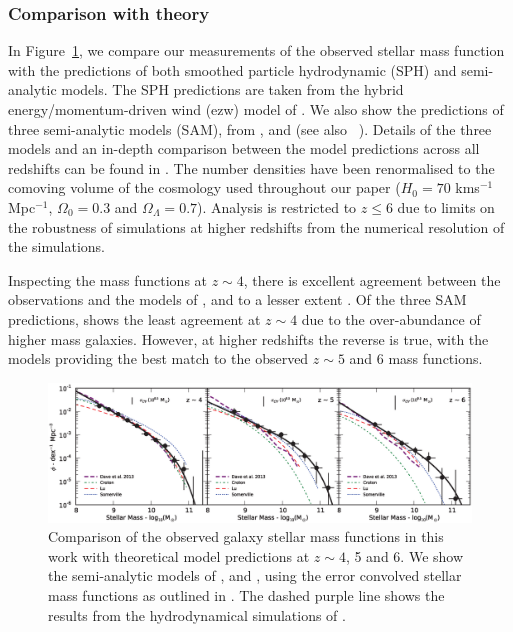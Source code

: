 \subsubsection{Comparison with theory}\label{sec:theory}
In Figure~\ref{fig:smf_theory}, we compare our measurements of the observed stellar mass function with the predictions of both smoothed particle hydrodynamic (SPH) and semi-analytic models. The SPH predictions are taken from the hybrid energy/momentum-driven wind (ezw) model of \citet{Dave:2013bf}. We also show the predictions of three semi-analytic models (SAM), from \citet{Croton:2006ew}, \citet{Lu:2011hj} and \citet{Somerville:2008ed} (see also \citeauthor{Somerville:2012cq}~\citeyear{Somerville:2012cq}). Details of the three models and an in-depth comparison between the model predictions across all redshifts can be found in \citet{Lu:2013ui}. The number densities have been renormalised to the comoving volume of the cosmology used throughout our paper ($H_{0} = 70$ kms$^{-1}$Mpc$^{-1}$, $\Omega_{0}=0.3$ and $\Omega_{\Lambda}=0.7$). Analysis is restricted to $z \leq 6$ due to limits on the robustness of simulations at higher redshifts from the numerical resolution of the simulations.

Inspecting the mass functions at $z \sim 4$, there is excellent agreement between the observations and the models of \citet{Dave:2013bf}, \citet{Croton:2006ew} and to a lesser extent \citet{Lu:2011hj}. Of the three SAM predictions, \citet{Somerville:2008ed} shows the least agreement at $z\sim 4$ due to the over-abundance of higher mass galaxies. However, at higher redshifts the reverse is true, with the \citet{Somerville:2008ed} models providing the best match to the observed $z\sim5$ and 6 mass functions.

\begin{figure}
\centering
\includegraphics[width=\textwidth]{plots/fig11.eps}
\caption{Comparison of the observed galaxy stellar mass functions in this work with theoretical model predictions at $z \sim 4$, 5 and 6. We show the semi-analytic models of \citet{Croton:2006ew}, \citet{Somerville:2008ed} and \citet{Lu:2011hj}, using the error convolved stellar mass functions as outlined in \citet{Lu:2013ui}. The dashed purple line shows the results from the hydrodynamical simulations of \citet{Dave:2013bf}.}
\label{fig:smf_theory}
\end{figure}

